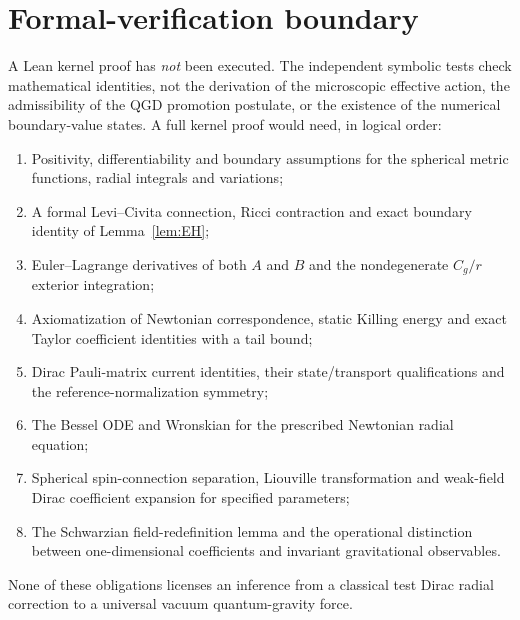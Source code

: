 \documentclass[11pt,a4paper,oneside]{report}
\numberwithin{equation}{chapter}
\theoremstyle{definition}\newtheorem{definition}[theorem]{Definition}
\theoremstyle{remark}\newtheorem{remark}[theorem]{Remark}
\begin{document}
\section{Formal-verification boundary}\label{app:lean}
A Lean kernel proof has \emph{not} been executed.  The independent
symbolic tests check mathematical identities, not the derivation of
the microscopic effective action, the admissibility of the QGD
promotion postulate, or the existence of the numerical boundary-value
states.  A full kernel proof would need, in logical order:
\begin{enumerate}
 \item Positivity, differentiability and boundary assumptions for the
 spherical metric functions, radial integrals and variations;
 \item A formal Levi--Civita connection, Ricci contraction and exact
 boundary identity of Lemma~\ref{lem:EH};
 \item Euler--Lagrange derivatives of both $A$ and $B$ and the
 nondegenerate $C_g/r$ exterior integration;
 \item Axiomatization of Newtonian correspondence, static Killing
 energy and exact Taylor coefficient identities with a tail bound;
 \item Dirac Pauli-matrix current identities, their state/transport
 qualifications and the reference-normalization symmetry;
 \item The Bessel ODE and Wronskian for the prescribed Newtonian
 radial equation;
 \item Spherical spin-connection separation, Liouville transformation
 and weak-field Dirac coefficient expansion for specified parameters;
 \item The Schwarzian field-redefinition lemma and the operational
 distinction between one-dimensional coefficients and invariant
 gravitational observables.
\end{enumerate}
None of these obligations licenses an inference from a classical test
Dirac radial correction to a universal vacuum quantum-gravity force.


\clearpage
\end{document}
